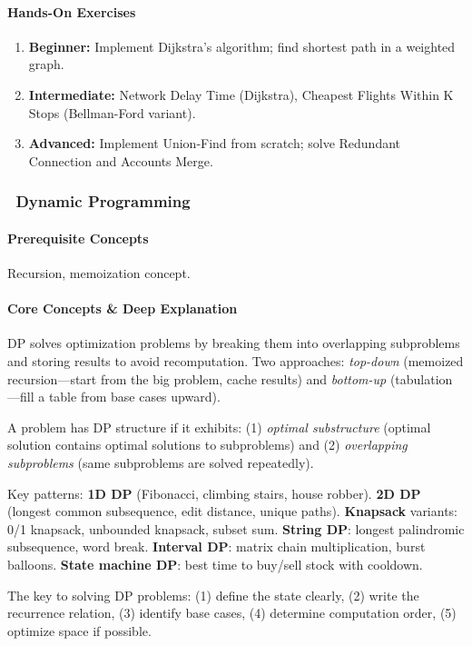 \documentclass[11pt, a4paper, oneside]{report}
\newcommand{\mustmaster}[1]{\subsubsection{\texorpdfstring{\fcolorbox{blue!40!black}{blue!8}{\footnotesize\bfseries\color{blue!40!black} MUST MASTER}~#1}{#1}}}
\begin{document}
\paragraph{Hands-On Exercises}
\begin{enumerate}[leftmargin=*]
\item \textbf{Beginner:} Implement Dijkstra's algorithm; find shortest path in a weighted graph.
\item \textbf{Intermediate:} Network Delay Time (Dijkstra), Cheapest Flights Within K Stops (Bellman-Ford variant).
\item \textbf{Advanced:} Implement Union-Find from scratch; solve Redundant Connection and Accounts Merge.
\end{enumerate}

\mustmaster{Dynamic Programming}

\paragraph{Prerequisite Concepts} Recursion, memoization concept.

\paragraph{Core Concepts \& Deep Explanation} DP solves optimization problems by breaking them into overlapping subproblems and storing results to avoid recomputation. Two approaches: \emph{top-down} (memoized recursion---start from the big problem, cache results) and \emph{bottom-up} (tabulation---fill a table from base cases upward).

A problem has DP structure if it exhibits: (1) \emph{optimal substructure} (optimal solution contains optimal solutions to subproblems) and (2) \emph{overlapping subproblems} (same subproblems are solved repeatedly).

Key patterns: \textbf{1D DP} (Fibonacci, climbing stairs, house robber). \textbf{2D DP} (longest common subsequence, edit distance, unique paths). \textbf{Knapsack} variants: 0/1 knapsack, unbounded knapsack, subset sum. \textbf{String DP}: longest palindromic subsequence, word break. \textbf{Interval DP}: matrix chain multiplication, burst balloons. \textbf{State machine DP}: best time to buy/sell stock with cooldown.

The key to solving DP problems: (1) define the state clearly, (2) write the recurrence relation, (3) identify base cases, (4) determine computation order, (5) optimize space if possible.
\end{document}
